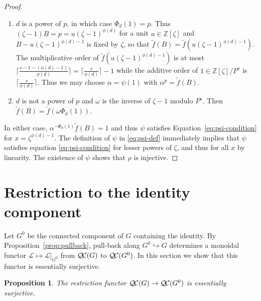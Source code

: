 \documentclass[11pt]{amsart}
\theoremstyle{plain}
\newtheorem{proposition}[theorem]{Proposition}
\theoremstyle{definition}
\theoremstyle{remark}
\newcommand{\ZZ}{{\mathbb{Z}}}
\newcommand{\cs}[1]{{\mathcal{#1}}}
\newcommand{\QC}{{\mathcal{Q\hskip-0.8pt C}}}
\begin{document}
\begin{proof}
  \begin{enumerate}
  \item $d$ is a power of $p$, in which case $\Phi_d(1) = p$.  Thus
    $(\zeta-1)B = p = u(\zeta-1)^{\phi(d)}$ for a unit $u \in \ZZ[\zeta]$
    and $B - u(\zeta-1)^{\phi(d)-1}$ is fixed by $\zeta$,
    so that $\tilde{f}(B) = \tilde{f}(u(\zeta - 1)^{\phi(d)-1})$.  The
    multiplicative order of $\tilde{f}(u(\zeta-1)^{\phi(d)-1})$ is at most
    $\lceil \frac{s - 1 - (\phi(d)-1)}{\phi(d)}\rceil = \lceil \frac{s}{\phi(d)} \rceil - 1$
    while the additive order of $1 \in \ZZ[\zeta]/P^s$ is $\lceil \frac{s}{\phi(d)} \rceil$.
    Thus we may choose $\alpha = \psi(1)$ with $\alpha^p = \tilde{f}(B)$.
  \item $d$ is not a power of $p$ and $\omega$ is the inverse of
    $\zeta-1$ modulo $P^s$.  Then $\tilde{f}(B) = \tilde{f}(\omega\Phi_d(1))$.
  \end{enumerate}
  In either case, $\alpha^{-\Phi_d(1)}\tilde{f}(B) = 1$ and thus
  $\psi$ satisfies Equation~\eqref{eq:psi-condition} for
  $x = \zeta^{\phi(d)-1}$.  The definition of $\psi$ in \ref{eq:psi-def}
  immediately implies that $\psi$ satisfies equation
  \ref{eq:psi-condition} for lesser powers of $\zeta$, and thus for
  all $x$ by linearity.  The existence of $\psi$ shows that $\rho$ is injective.
\end{proof}

\section{Restriction to the identity component} \label{sec:restriction}

%

Let $G^0$ be the connected component of $G$ containing the identity.
By Proposition~\ref{prop:pullback}, pull-back along
$G^0\hookrightarrow G$ determines a monoidal functor
$\cs{L}\mapsto \cs{L}\vert_{G^0}$ from $\QC(G)$ to $\QC(G^0)$.  In
this section we show that this functor is essentially surjective. 

\begin{proposition}\label{prop:restriction}
  The restriction functor $\QC(G)\to \QC(G^0)$ is essentially surjective.
\end{proposition}
\end{document}
